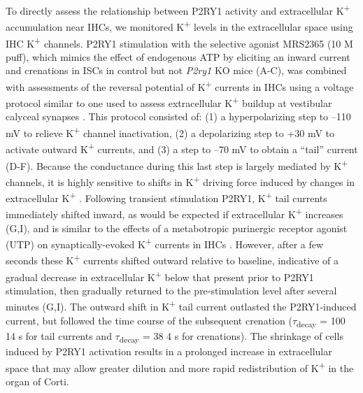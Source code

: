 \documentclass[9pt,lineno]{elife}
\begin{document}
To directly assess the relationship between P2RY1 activity and extracellular K\textsuperscript{+} accumulation near IHCs, we monitored K\textsuperscript{+} levels in the extracellular space using IHC K\textsuperscript{+} channels. P2RY1 stimulation with the selective agonist MRS2365 (10 \textmu M puff), which mimics the effect of endogenous ATP by eliciting an inward current and crenations in ISCs in control but not \textit{P2ry1} KO mice (A-C), was combined with assessments of the reversal potential of K\textsuperscript{+} currents in IHCs using a voltage protocol similar to one used to assess extracellular K\textsuperscript{+} buildup at vestibular calyceal synapses \citep{Lim2011}. This protocol consisted of: (1) a hyperpolarizing step to --110 mV to relieve K\textsuperscript{+} channel inactivation, (2) a depolarizing step to +30 mV to activate outward K\textsuperscript{+} currents, and (3) a step to --70 mV to obtain a ``tail'' current (D-F). Because the conductance during this last step is largely mediated by K\textsuperscript{+} channels, it is highly sensitive to shifts in K\textsuperscript{+} driving force induced by changes in extracellular K\textsuperscript{+} \citep{Contini2017,Lim2011}. Following transient stimulation P2RY1, K\textsuperscript{+} tail currents immediately shifted inward, as would be expected if extracellular K\textsuperscript{+} increases (G,I), and is similar to the effects of a metabotropic purinergic receptor agonist (UTP) on synaptically-evoked K\textsuperscript{+} currents in IHCs \citep{Wang2015}. However, after a few seconds these K\textsuperscript{+} currents shifted outward relative to baseline, indicative of a gradual decrease in extracellular K\textsuperscript{+} below that present prior to P2RY1 stimulation, then gradually returned to the pre-stimulation level after several minutes (G,I). The outward shift in K\textsuperscript{+} tail current outlasted the P2RY1-induced current, but followed the time course of the subsequent crenation ($ \tau $\textsubscript{decay} = 100 \textpm \hspace{0.2 mm} 14 s for tail currents and $ \tau $\textsubscript{decay} = 38 \textpm \hspace{0.2 mm} 4 s for crenations). The shrinkage of cells induced by P2RY1 activation results in a prolonged increase in extracellular space that may allow greater dilution and more rapid redistribution of K\textsuperscript{+} in the organ of Corti. 
\end{document}
